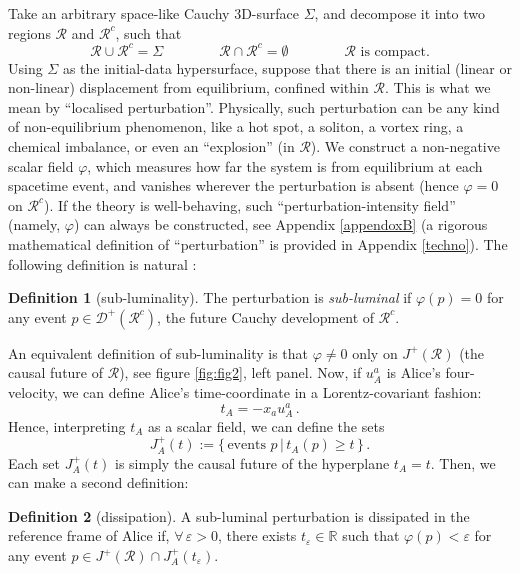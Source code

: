 \documentclass[a4paper, amsfonts, amssymb, amsmath, reprint, showkeys,  twoside, onecolumn,notitlepage,nofootinbib]{revtex4-1}
\newcommand{\spc}{\quad \quad \quad}
\theoremstyle{definition}
\newtheorem{definition}{Definition}
\theoremstyle{theorem}
\begin{document}
Take an arbitrary space-like Cauchy 3D-surface $\Sigma$, and decompose it into two regions $\mathcal{R}$ and $\mathcal{R}^c$, such that
\begin{equation}
\mathcal{R} \cup \mathcal{R}^c = \Sigma   \quad \spc \mathcal{R} \cap \mathcal{R}^c = \emptyset \spc \quad \mathcal{R} \text{ is compact} .
\end{equation}
Using $\Sigma$ as the initial-data hypersurface, suppose that there is an initial (linear or non-linear) displacement from equilibrium, confined within $\mathcal{R}$. This is what we mean by ``localised perturbation''. Physically, such perturbation can be any kind of non-equilibrium phenomenon, like a hot spot, a soliton, a vortex ring, a chemical imbalance, or even an ``explosion'' (in $\mathcal{R}$). We construct a non-negative scalar field $\varphi$, which measures how far the system is from equilibrium at each spacetime event, and vanishes wherever the perturbation is absent (hence $\varphi =0$ on $\mathcal{R}^c$). If the theory is well-behaving, such ``perturbation-intensity field'' (namely, $\varphi$) can always be constructed, see Appendix \ref{appendoxB} (a rigorous mathematical definition of ``perturbation'' is provided in Appendix \ref{techno}). The following definition is natural \cite{Hawking1973,Wald,BemficaCausality2018}:
\begin{definition}[sub-luminality]\label{sub}
The perturbation is \textit{sub-luminal} if $\varphi(p) =0$ for any event $p \in \mathcal{D}^+(\mathcal{R}^c)$, the future Cauchy development of $\mathcal{R}^c$.  
\end{definition}
\noindent An equivalent definition of sub-luminality is that $\varphi \neq 0$ only on $J^+(\mathcal{R})$ (the causal future of $\mathcal{R}$), see figure \ref{fig:fig2}, left panel. Now, if $u_A^a$ is Alice's four-velocity, we can define Alice's time-coordinate in a Lorentz-covariant fashion:
\begin{equation}
t_A = -x_a u_A^a  \, .
\end{equation}
Hence, interpreting $t_A$ as a scalar field, we can define the sets
\begin{equation}
J^+_A (t):= \{ \, \text{events }p \, | \, t_A(p) \geq t \, \} \, .
\end{equation}
Each set $J^+_A (t)$ is simply the causal future of the hyperplane $t_A=t$. Then, we can make a second definition:
\begin{definition}[dissipation]\label{diss}
A sub-luminal perturbation is dissipated in the reference frame of Alice if, $\forall \, \varepsilon >0$, there exists $t_\varepsilon \in \mathbb{R}$ such that $\varphi(p)<\varepsilon$ for any event $p \in J^+(\mathcal{R}) \cap J^+_A (t_\varepsilon)$. 
\end{definition}
\end{document}
